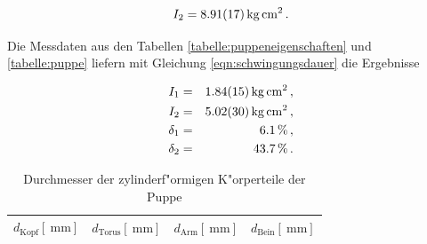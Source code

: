 				\begin{equation*}
					I_2 = \SI{8.91 (17)}{\kilo \gram \centi \meter \squared} \,.
				\end{equation*}

				Die Messdaten aus den Tabellen \ref{tabelle:puppeneigenschaften} und \ref{tabelle:puppe} liefern mit Gleichung \eqref{eqn:schwingungsdauer} die Ergebnisse

				\begin{eqnarray*}
					I_1 & = & \SI{1.84 (15)}{\kilo \gram \centi \meter \squared} \,, \\
					I_2 & = & \SI{5.02 (30)}{\kilo \gram \centi \meter \squared} \,, \\
					\delta_1 & = & \SI{6.1}{\percent} \,, \\
					\delta_2 & = & \SI{43.7}{\percent} \,.
				\end{eqnarray*}

				\clearpage

				\begin{table}[h!]
					\begin{center}
						\caption{Durchmesser der zylinderf"ormigen K"orperteile der Puppe \label{tabelle:puppenradien}}
						\begin{tabular}{|c|c|c|c|}
							\hline
							$d_\mathrm{Kopf} [\SI{}{\milli \meter}]$ & $d_\mathrm{Torus} [\SI{}{\milli \meter}]$ & $d_\mathrm{Arm} [\SI{}{\milli \meter}]$ & $d_\mathrm{Bein} [\SI{}{\milli \meter}]$ \\
							\hline 
							\hline
							
							\hline 
						\end{tabular}
					\end{center}
					
				\end{table}

